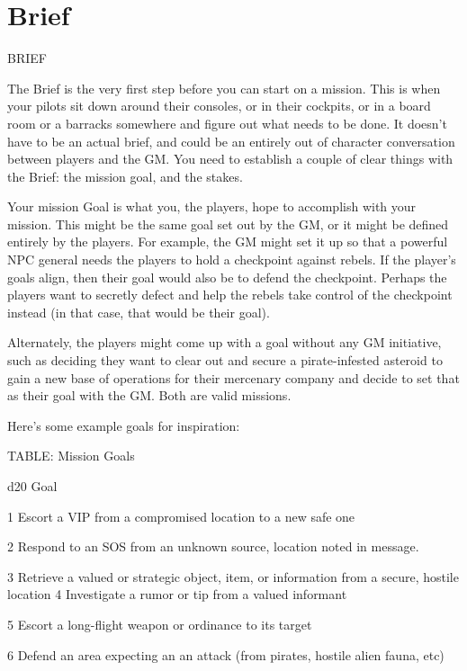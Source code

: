 \chapter{Brief}
                                                     BRIEF


The Brief is the very first step before you can start on a mission. This is when your pilots sit down
around their consoles, or in their cockpits, or in a board room or a barracks somewhere and
figure out what needs to be done. It doesn’t have to be an actual brief, and could be an entirely
out of character conversation between players and the GM. You need to establish a couple of
clear things with the Brief: the mission goal, and the stakes.


Your mission Goal is what you, the players, hope to accomplish with your mission. This might be
the same goal set out by the GM, or it might be defined entirely by the players. For example, the
GM might set it up so that a powerful NPC general needs the players to hold a checkpoint
against rebels. If the player’s goals align, then their goal would also be to defend the checkpoint.
Perhaps the players want to secretly defect and help the rebels take control of the checkpoint
instead (in that case, that would be their goal).


Alternately, the players might come up with a goal without any GM initiative, such as deciding
they want to clear out and secure a pirate-infested asteroid to gain a new base of operations for
their mercenary company and decide to set that as their goal with the GM. Both are valid
missions.





Here’s some example goals for inspiration:


TABLE: Mission Goals


 d20       Goal

 1         Escort a VIP from a compromised location to a new safe one

 2         Respond to an SOS from an unknown source, location noted in message.

 3         Retrieve a valued or strategic object, item, or information from a secure, hostile
           location
 4         Investigate a rumor or tip from a valued informant

 5         Escort a long-flight weapon or ordinance to its target

 6         Defend an area expecting an an attack (from pirates, hostile alien fauna, etc)

